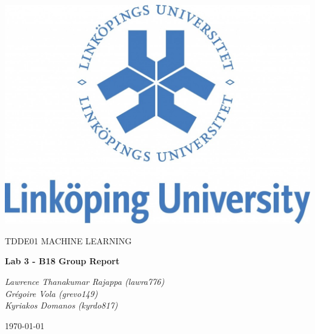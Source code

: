 \documentclass[a4paper,10pt]{article}
\begin{document}
\begin{titlepage}
	\centering
	\includegraphics[width=.6\textwidth]{liu-logo.png}\par
	\vfill
	{\scshape\Large TDDE01 MACHINE LEARNING\par}
	{\huge\bfseries Lab 3 - B18 Group Report\par}
	\vspace{0.5cm}
    {\large\itshape Lawrence Thanakumar Rajappa (lawra776)\\
     \large\itshape Grégoire Vola (grevo149)\\
     \large\itshape Kyriakos Domanos (kyrdo817)\par}
	\vfill
	{\large \today\par}
\end{titlepage}
\end{document}
